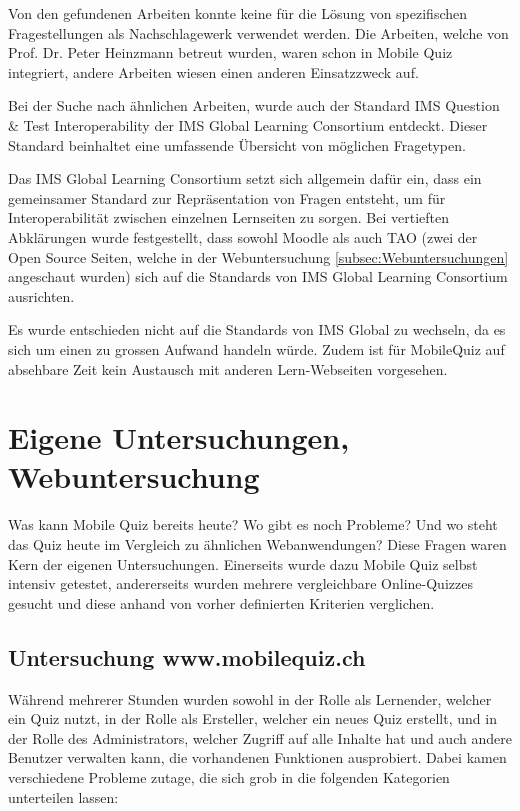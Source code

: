 Von den gefundenen Arbeiten konnte keine für die Lösung von spezifischen Fragestellungen als Nachschlagewerk verwendet werden. Die Arbeiten, welche von Prof. Dr. Peter Heinzmann betreut wurden, waren schon in Mobile Quiz integriert, andere Arbeiten wiesen einen anderen Einsatzzweck auf.

\bigskip

Bei der Suche nach ähnlichen Arbeiten, wurde auch der Standard \glqq IMS Question \& Test Interoperability\grqq \cite{imsglobal.org} der IMS Global Learning Consortium entdeckt. Dieser Standard beinhaltet eine umfassende Übersicht von möglichen Fragetypen.

Das IMS Global Learning Consortium setzt sich allgemein dafür ein, dass ein gemeinsamer Standard zur Repräsentation von Fragen entsteht, um für Interoperabilität zwischen einzelnen Lernseiten zu sorgen. Bei vertieften Abklärungen wurde festgestellt, dass sowohl Moodle \cite{moodle} als auch TAO \cite{tao} (zwei der Open Source Seiten, welche in der Webuntersuchung \ref{subsec:Webuntersuchungen} angeschaut wurden) sich auf die Standards von IMS Global Learning Consortium ausrichten.

Es wurde entschieden nicht auf die Standards von IMS Global zu wechseln, da es sich um einen zu grossen Aufwand handeln würde. Zudem ist für MobileQuiz auf absehbare Zeit kein Austausch mit anderen Lern-Webseiten vorgesehen.


\section{Eigene Untersuchungen, Webuntersuchung}
\label{sec:eigeneUntersuchungenWebuntersuchungen}

Was kann Mobile Quiz bereits heute? Wo gibt es noch Probleme? Und wo steht das Quiz heute im Vergleich zu ähnlichen Webanwendungen? Diese Fragen waren Kern der eigenen Untersuchungen. Einerseits wurde dazu Mobile Quiz selbst intensiv getestet, andererseits wurden mehrere vergleichbare Online-Quizzes gesucht und diese anhand von vorher definierten Kriterien verglichen.


	\subsection{Untersuchung www.mobilequiz.ch}
	\label{subsec:eigeneUntersuchungen}
	Während mehrerer Stunden wurden sowohl in der Rolle als Lernender, welcher ein Quiz nutzt, in der Rolle als Ersteller, welcher ein neues Quiz erstellt, und in der Rolle des Administrators, welcher Zugriff auf alle Inhalte hat und auch andere Benutzer verwalten kann, die vorhandenen Funktionen ausprobiert. Dabei kamen verschiedene Probleme zutage, die sich grob in die folgenden Kategorien unterteilen lassen:
	
